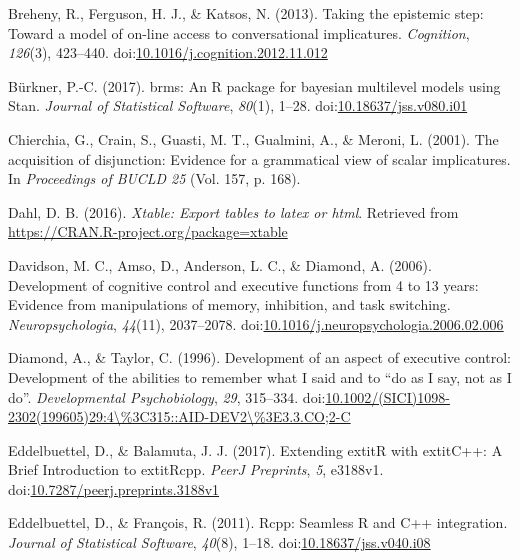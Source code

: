 \documentclass[man]{apa6}
\theoremstyle{definition}
\theoremstyle{definition}
\theoremstyle{definition}
\theoremstyle{remark}
\begin{document}
\hypertarget{ref-breheny2013}{}
Breheny, R., Ferguson, H. J., \& Katsos, N. (2013). Taking the epistemic
step: Toward a model of on-line access to conversational implicatures.
\emph{Cognition}, \emph{126}(3), 423--440.
doi:\href{https://doi.org/10.1016/j.cognition.2012.11.012}{10.1016/j.cognition.2012.11.012}

\hypertarget{ref-R-brms}{}
Bürkner, P.-C. (2017). brms: An R package for bayesian multilevel models
using Stan. \emph{Journal of Statistical Software}, \emph{80}(1), 1--28.
doi:\href{https://doi.org/10.18637/jss.v080.i01}{10.18637/jss.v080.i01}

\hypertarget{ref-chierchia2001}{}
Chierchia, G., Crain, S., Guasti, M. T., Gualmini, A., \& Meroni, L.
(2001). The acquisition of disjunction: Evidence for a grammatical view
of scalar implicatures. In \emph{Proceedings of BUCLD 25} (Vol. 157, p.
168).

\hypertarget{ref-R-xtable}{}
Dahl, D. B. (2016). \emph{Xtable: Export tables to latex or html}.
Retrieved from \url{https://CRAN.R-project.org/package=xtable}

\hypertarget{ref-davidson2006}{}
Davidson, M. C., Amso, D., Anderson, L. C., \& Diamond, A. (2006).
Development of cognitive control and executive functions from 4 to 13
years: Evidence from manipulations of memory, inhibition, and task
switching. \emph{Neuropsychologia}, \emph{44}(11), 2037--2078.
doi:\href{https://doi.org/10.1016/j.neuropsychologia.2006.02.006}{10.1016/j.neuropsychologia.2006.02.006}

\hypertarget{ref-diamond1996}{}
Diamond, A., \& Taylor, C. (1996). Development of an aspect of executive
control: Development of the abilities to remember what I said and to
``do as I say, not as I do''. \emph{Developmental Psychobiology},
\emph{29}, 315--334.
doi:\href{https://doi.org/10.1002/(SICI)1098-2302(199605)29:4/\%3C315::AID-DEV2/\%3E3.3.CO;2-C}{10.1002/(SICI)1098-2302(199605)29:4\textbackslash{}\%3C315::AID-DEV2\textbackslash{}\%3E3.3.CO;2-C}

\hypertarget{ref-R-Rcpp_b}{}
Eddelbuettel, D., \& Balamuta, J. J. (2017). Extending extitR with
extitC++: A Brief Introduction to extitRcpp. \emph{PeerJ Preprints},
\emph{5}, e3188v1.
doi:\href{https://doi.org/10.7287/peerj.preprints.3188v1}{10.7287/peerj.preprints.3188v1}

\hypertarget{ref-R-Rcpp_a}{}
Eddelbuettel, D., \& François, R. (2011). Rcpp: Seamless R and C++
integration. \emph{Journal of Statistical Software}, \emph{40}(8),
1--18.
doi:\href{https://doi.org/10.18637/jss.v040.i08}{10.18637/jss.v040.i08}
\end{document}

